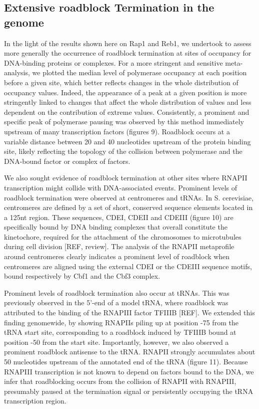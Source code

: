 \singlespacing
\subsection*{Extensive roadblock Termination in the \cer{} genome}
\doublespacing

In the light of the results shown here on Rap1 and Reb1, we undertook to assess more generally the occurrence of roadblock termination at sites of occupancy for DNA-binding proteins or complexes. For a more stringent and sensitive meta-analysis, we plotted the median level of polymerase occupancy at each position before a given site, which better reflects changes in the whole distribution of occupancy values. Indeed, the appearance of a peak at a given position is more stringently linked to changes that affect the whole distribution of values and less dependent on the contribution of extreme values. Consistently, a prominent and specific peak of polymerase pausing was observed by this method immediately upstream of many transcription factors (figures 9).  Roadblock occurs at a variable distance between 20 and 40 nucleotides upstream of the protein binding site, likely reflecting the topology of the collision between polymerase and the DNA-bound factor or complex of factors. 

We also sought evidence of roadblock termination at other sites where RNAPII transcription might collide with DNA-associated events. Prominent levels of roadblock termination were observed at centromeres and tRNAs. In S. cerevisiae, centromeres are defined by a set of short, conserved sequence elements located in a 125nt region. These sequences, CDEI, CDEII and CDEIII (figure 10) are specifically bound by DNA binding complexes that overall constitute the kinetochore, required for the attachment of the chromosomes to microtubules during cell division [REF, review]. The analysis of the RNAPII metaprofile around centromeres clearly indicates a prominent level of roadblock when centromeres are aligned using the external CDEI or the CDEIII sequence motifs, bound respectively by Cbf1 and the Cbf3 complex. 

Prominent levels of roadblock termination also occur at tRNAs. This was previously observed in the 5’-end of a model tRNA, where roadblock was attributed to the binding of the RNAPIII factor TFIIIB [REF]. We extended this finding genomewide, by showing RNAPIIs piling up at position -75 from the tRNA start site, corresponding to a roadblock induced by TFIIIB bound at position -50 from the start site. Importantly, however, we also observed a prominent roadblock antisense to the tRNA. RNAPII strongly accumulates about 50 nucleotides upstream of the annotated end of the tRNA (figure 11). Because RNAPIII transcription is not known to depend on factors bound to the DNA, we infer that roadblocking occurs from the collision of RNAPII with RNAPIII, presumably paused at the termination signal or persistently occupying the tRNA transcription region. 

